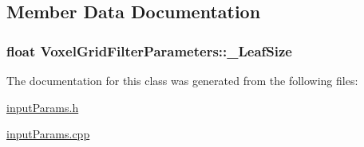 \subsection{Member Data Documentation}
\hypertarget{classVoxelGridFilterParameters_a31175242a7e2750e44189d9e2e4b8d87}{
\subsubsection[{\-\_\-\-Leaf\-Size}]{\setlength{\rightskip}{0pt plus 5cm}float Voxel\-Grid\-Filter\-Parameters\-::\-\_\-\-Leaf\-Size\hspace{0.3cm}{\ttfamily [private]}}}\label{classVoxelGridFilterParameters_a31175242a7e2750e44189d9e2e4b8d87}


The documentation for this class was generated from the following files\-:\begin{DoxyCompactItemize}
\item 
\hyperlink{inputParams_8h}{input\-Params.\-h}\item 
\hyperlink{inputParams_8cpp}{input\-Params.\-cpp}\end{DoxyCompactItemize}
